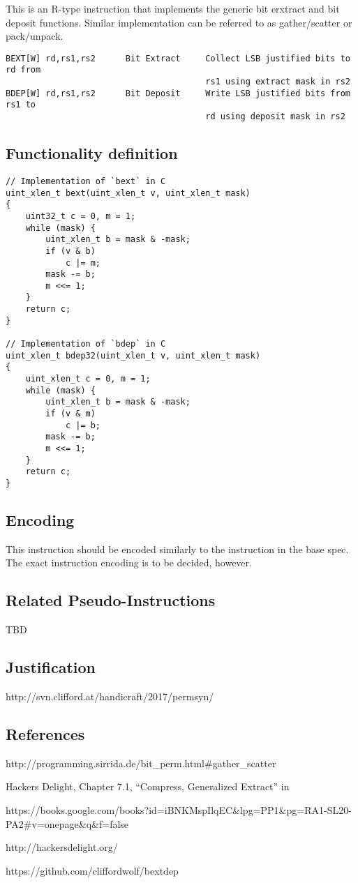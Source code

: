 This is an R-type instruction that implements the generic bit erxtract
and bit deposit functions. Similar implementation can be referred to as
gather/scatter or pack/unpack.

\begin{verbatim}
BEXT[W] rd,rs1,rs2      Bit Extract     Collect LSB justified bits to rd from
                                        rs1 using extract mask in rs2
BDEP[W] rd,rs1,rs2      Bit Deposit     Write LSB justified bits from rs1 to
                                        rd using deposit mask in rs2
\end{verbatim}

\subsection{Functionality definition}

\begin{verbatim}
// Implementation of `bext` in C
uint_xlen_t bext(uint_xlen_t v, uint_xlen_t mask)
{
    uint32_t c = 0, m = 1;
    while (mask) {
        uint_xlen_t b = mask & -mask;
        if (v & b)
            c |= m;
        mask -= b;
        m <<= 1;
    }
    return c;
}

// Implementation of `bdep` in C
uint_xlen_t bdep32(uint_xlen_t v, uint_xlen_t mask)
{
    uint_xlen_t c = 0, m = 1;
    while (mask) {
        uint_xlen_t b = mask & -mask;
        if (v & m)
            c |= b;
        mask -= b;
        m <<= 1;
    }
    return c;
}
\end{verbatim}

\subsection{Encoding}



This instruction should be encoded similarly to the instruction in the
base spec. The exact instruction encoding is to be decided, however.

\subsection{Related Pseudo-Instructions}

TBD

\subsection{Justification}

http://svn.clifford.at/handicraft/2017/permsyn/

\subsection{References}

http://programming.sirrida.de/bit\_perm.html\#gather\_scatter

Hackers Delight, Chapter 7.1, ``Compress, Generalized Extract'' in

https://books.google.com/books?id=iBNKMspIlqEC\&lpg=PP1\&pg=RA1-SL20-PA2\#v=onepage\&q\&f=false

http://hackersdelight.org/

https://github.com/cliffordwolf/bextdep
